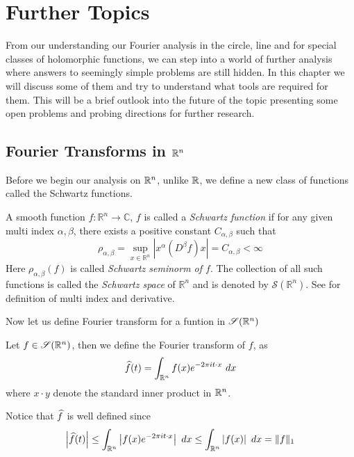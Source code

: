 
\chapter{Further Topics}

From our understanding our Fourier analysis in the circle, line and for special classes of holomorphic functions, we can step into a world of further analysis where answers to seemingly simple problems are still hidden. In this chapter we will discuss some of them and try to understand what tools are required for them. This will be a brief outlook into the future of the topic presenting some open problems and probing directions for further research.

\section{Fourier Transforms in $\mathbb R^n$}
Before we begin our analysis on $\mathbb R^n$, unlike $\mathbb R$, we define a new class of functions called the Schwartz functions.

\begin{definition}
\label{def:schwartz_class}
A smooth function $f:\mathbb{R}^n \to \mathbb{C}$, $f$ is called a \emph{Schwartz function} if for any given multi index $\alpha, \beta$, there exists a positive constant $C_{\alpha, \beta}$ such that $$\rho_{\alpha, \beta} = \sup_{x \in \mathbb{R}^n} \left|x^\alpha (D^\beta f)x \right| = C_{\alpha, \beta} < \infty$$ 
Here $\rho_{\alpha, \beta}(f)$ is called \emph{Schwartz seminorm of $f$}. The collection of all such functions is called the \emph{Schwartz space} of $\mathbb{R}^n$ and is denoted by $\mathscr{S}(\mathbb{R}^n)$. 
See \autocite[Appendix A.3]{perko_differential_2001} for definition of multi index and derivative.
\end{definition}

Now let us define Fourier transform for a funtion in $\mathscr{S}(\mathbb R^n)$
\begin{definition}
  \label{def:fourier_transform_in_Rn}
  Let $f \in \mathscr{S}(\mathbb R^n)$, then we define the Fourier transform of $f$, as $$\widehat{f}(t) = \int_{\mathbb R^n} f(x) e^{-2\pi i t\cdot x} \ dx $$
  where $x \cdot y$ denote the standard inner product in $\mathbb R^n$.
\end{definition}

Notice that $\widehat{f}$ is well defined since $$\left|\widehat{f}(t)\right| \le \int_{\mathbb R^n} \left|f(x) e^{-2\pi i t\cdot x}\right| \ dx \le \int_{\mathbb R^n} \left|f(x)\right| \ dx  = \|f\|_1$$


